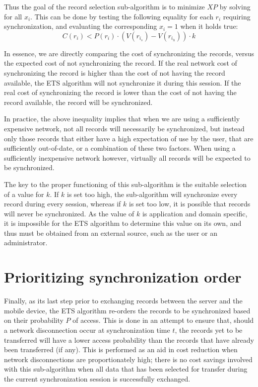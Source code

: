 Thus the goal of the record selection sub-algorithm is to minimize $XP$ by solving for all $x_i$.  This can be done by testing the following equality for each $r_i$ requiring synchronization, and evaluating the corresponding $x_i = 1$ when it holds true:
\begin{equation}
C(r_i) < P(r_i)\cdot(V(r_{i_s})-V(r_{i_h}))\cdot k \label{sync_cost_inequality}
\end{equation}

In essence, we are directly comparing the cost of synchronizing the records, versus the expected cost of not synchronizing the record.  If the real network cost of synchronizing the record is higher than the cost of not having the record available, the ETS algorithm will not synchronize it during this session.  If the real cost of synchronizing the record is lower than the cost of not having the record available, the record will be synchronized.

In practice, the above inequality implies that when we are using a sufficiently expensive network, not all records will necessarily be synchronized, but instead only those records that either have a high expectation of use by the user, that are sufficiently out-of-date, or a combination of these two factors.  When using a sufficiently inexpensive network however, virtually all records will be expected to be synchronized.

The key to the proper functioning of this sub-algorithm is the suitable selection of a value for $k$.  If $k$ is set too high, the sub-algorithm will synchronize every record during every session, whereas if $k$ is set too low, it is possible that records will never be synchronized.  As the value of $k$ is application and domain specific, it is impossible for the ETS algorithm to determine this value on its own, and thus must be obtained from an external source, such as the user or an administrator.

\section{Prioritizing synchronization order}

Finally, as its last step prior to exchanging records between the server and the mobile device, the ETS algorithm re-orders the records to be synchronized based on their probability $P$ of access.  This is done in an attempt to ensure that, should a network disconnection occur at synchronization time $t$, the records yet to be transferred will have a lower access probability than the records that have already been transferred (if any).  This is performed as an aid in cost reduction when network disconnections are proportionately high; there is no cost savings involved with this sub-algorithm when all data that has been selected for transfer during the current synchronization session is successfully exchanged.

